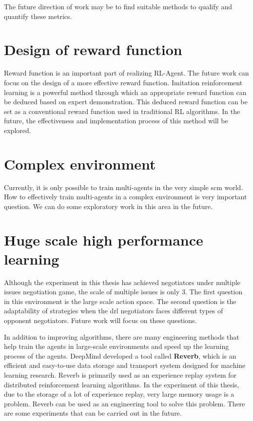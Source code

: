 The future direction of work may be to find suitable methods to qualify and quantify these metrics.

\section{Design of reward function}
Reward function is an important part of realizing RL-Agent. The future work can focus on the design of a more effective reward function. Imitation reinforcement learning is a powerful method through which an appropriate reward function can be deduced based on expert demonstration. This deduced reward function can be set as a conventional reward function used in traditional RL algorithms. In the future, the effectiveness and implementation process of this method will be explored.

\section{Complex environment}
Currently, it is only possible to train multi-agents in the very simple \gls{scm} world. How to effectively train multi-agents in a complex environment is very important question. We can do some exploratory work in this area in the future.

\section{Huge scale high performance learning}
Although the experiment in this thesis has achieved negotiators under multiple issues negotiation game, the scale of multiple issues is only 3. The first question in this environment is the large scale action space. The second question is the adaptability of strategies when the \gls{drl} negotiators faces different types of opponent negotiators. Future work will focus on these questions.
 
In addition to improving algorithms, there are many engineering methods that help train the agents in large-scale environments and speed up the learning process of the agents. DeepMind developed a tool called \textbf{Reverb}\parencite{cassirer2021reverb}, which is an efficient and easy-to-use data storage and transport system designed for machine learning research. Reverb is primarily used as an experience replay system for distributed reinforcement learning algorithms. In the experiment of this thesis, due to the storage of a lot of experience replay, very large memory usage is a problem. Reverb can be used as an engineering tool to solve this problem. There are some experiments that can be carried out in the future.
